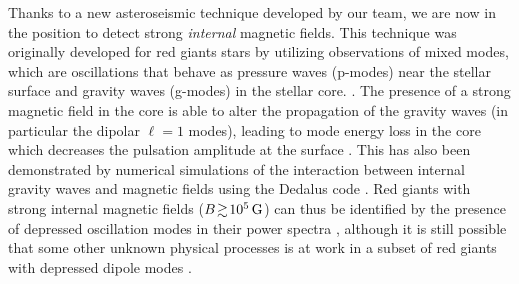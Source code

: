 Thanks to a new asteroseismic technique developed by our team, we are now in the position to detect strong {\it internal} magnetic fields. This technique was originally developed for red giants stars by utilizing observations of mixed modes, which are oscillations that behave as pressure waves (p-modes) near the stellar surface and gravity waves (g-modes) in the stellar core. \citep[e.g][]{Beck_2011}. The presence of a strong magnetic field in the core is able to alter the propagation of the gravity waves (in particular the dipolar $\ell =1$ modes),
leading to mode energy loss in the core which decreases the pulsation amplitude at the surface \citep{Fuller_2015}. This has also been demonstrated by numerical simulations of the interaction between internal gravity waves and magnetic fields using the Dedalus code \citep{Lecoanet_2016}. Red giants with strong internal magnetic fields ($B \! \gtrsim \! 10^5 \, {\rm G}$) can thus be identified by the presence of depressed oscillation modes in their power spectra \citep{Fuller_2015,Stello_2016}, 
although it is still possible that some other unknown physical processes is at work in a subset of red giants with depressed dipole modes \citet{Mosser_2017}.
